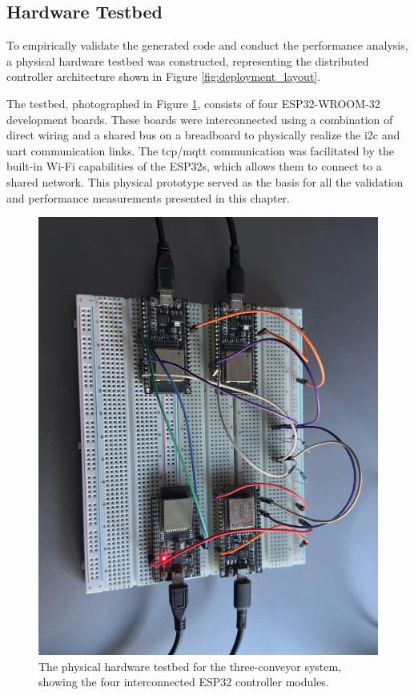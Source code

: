 \subsection{Hardware Testbed}
\label{subsec:hardware_setup}

To empirically validate the generated code and conduct the performance analysis, a physical hardware testbed was constructed, representing the distributed controller architecture shown in Figure \ref{fig:deployment_layout}. 

The testbed, photographed in Figure \ref{fig:hardware_photo}, consists of four ESP32-WROOM-32 development boards. These boards were interconnected using a combination of direct wiring and a shared bus on a breadboard to physically realize the \gls{i2c} and \gls{uart} communication links. The \gls{tcp}/\gls{mqtt} communication was facilitated by the built-in Wi-Fi capabilities of the ESP32s, which allows them to connect to a shared network. This physical prototype served as the basis for all the validation and performance measurements presented in this chapter.

\begin{figure}[htb!]
    \centering
    \includegraphics[width=0.9\columnwidth]{Chapters/Figures/photo_of_setup.jpeg}
    \caption{The physical hardware testbed for the three-conveyor system, showing the four interconnected ESP32 controller modules.}
    \label{fig:hardware_photo}
\end{figure}


